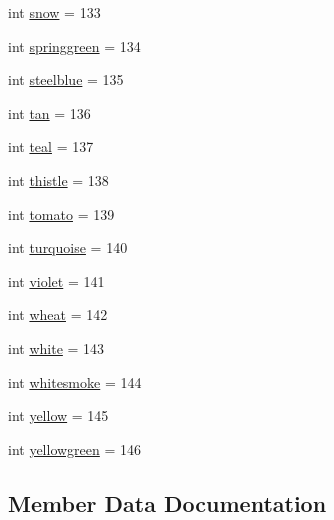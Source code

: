 \begin{DoxyCompactItemize}
\item 
int \hyperlink{classbridges_1_1named__color_1_1_named_color_a1f275813841baae4888174bdc4616f6f}{snow} = 133
\item 
int \hyperlink{classbridges_1_1named__color_1_1_named_color_a0d3796b624eb8e15f0d1f50fa079b922}{springgreen} = 134
\item 
int \hyperlink{classbridges_1_1named__color_1_1_named_color_ab874eb13c2307740ef2403c239d959e6}{steelblue} = 135
\item 
int \hyperlink{classbridges_1_1named__color_1_1_named_color_aec34f362841f5de3305cbd74e6857bec}{tan} = 136
\item 
int \hyperlink{classbridges_1_1named__color_1_1_named_color_acff734e464d9e49184474d7e4c434de2}{teal} = 137
\item 
int \hyperlink{classbridges_1_1named__color_1_1_named_color_ac27ec92a7501e5af8e032590c2390c6f}{thistle} = 138
\item 
int \hyperlink{classbridges_1_1named__color_1_1_named_color_aea54bccf369fb165ba5c11344f5017a1}{tomato} = 139
\item 
int \hyperlink{classbridges_1_1named__color_1_1_named_color_a136baadeaf4dfb0869c63dec5009705d}{turquoise} = 140
\item 
int \hyperlink{classbridges_1_1named__color_1_1_named_color_ac0c5403fd2860a8abd7a4e8600ef6d80}{violet} = 141
\item 
int \hyperlink{classbridges_1_1named__color_1_1_named_color_a812a52c4dc9cedead855017cda1d8170}{wheat} = 142
\item 
int \hyperlink{classbridges_1_1named__color_1_1_named_color_a087174c88b226d37b042562b71b9710d}{white} = 143
\item 
int \hyperlink{classbridges_1_1named__color_1_1_named_color_aa7795320a0fa4698fe4132054fcf4ac3}{whitesmoke} = 144
\item 
int \hyperlink{classbridges_1_1named__color_1_1_named_color_a2437e7564828555a86f2364834703a8d}{yellow} = 145
\item 
int \hyperlink{classbridges_1_1named__color_1_1_named_color_a74aef0729d05ac029a522364fd21dd7a}{yellowgreen} = 146
\end{DoxyCompactItemize}


\subsection{Member Data Documentation}
\mbox{\label{classbridges_1_1named__color_1_1_named_color_aee5ed43983f4942acabae2cb74b9c6fd}} 
